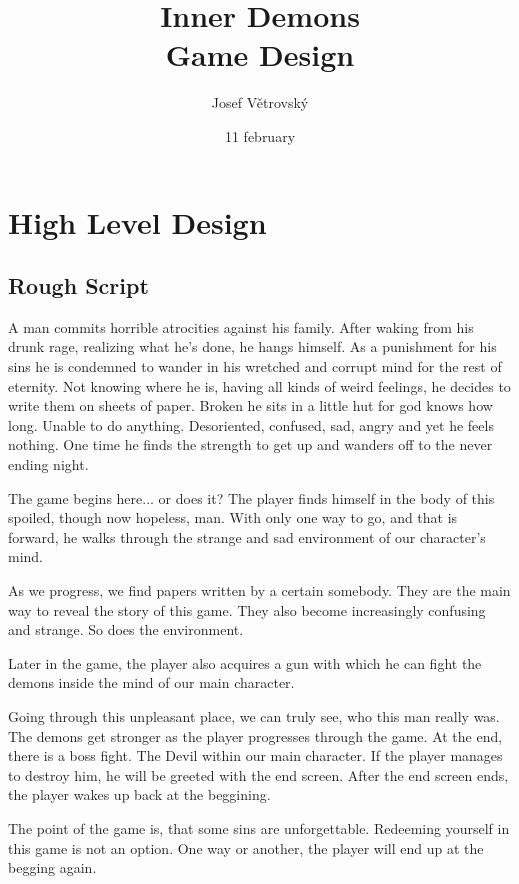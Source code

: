 \documentclass{article}
\title{Inner Demons\\Game Design}
\author{Josef Větrovský}
\date{11 february}
\begin{document}
\maketitle
\thispagestyle{empty}
\cleardoublepage
\tableofcontents
\thispagestyle{empty}
\cleardoublepage
\setcounter{page}{1}
\section{High Level Design}\label{high}
\subsection{Rough Script}
    A man commits horrible atrocities against his family. After waking from his drunk
    rage, realizing what he's done, he hangs himself. As a punishment for his sins
    he is condemned to wander in his wretched and corrupt mind for the rest of eternity.
    Not knowing where he is, having all kinds of weird feelings, he decides to write them
    on sheets of paper. Broken he sits in a little hut for god knows how long. Unable
    to do anything. Desoriented, confused, sad, angry and yet he feels nothing.
    One time he finds the strength to get up and wanders off to the never ending night.

    The game begins here... or does it? The player finds himself in the body of this
    spoiled, though now hopeless, man. With only one way to go, and that is forward,
    he walks through the strange and sad environment of our character's mind.
    
    As we progress, we find papers written by a certain somebody. They are the main way to reveal the story of
    this game. They also become increasingly confusing and strange. So does the environment.

    Later in the game, the player also acquires a gun with which he can fight the demons
    inside the mind of our main character.

    Going through this unpleasant place, we can truly see, who this man really was.
    The demons get stronger as the player progresses through the game.
    At the end, there is a boss fight. The Devil within our main character. If the player
    manages to destroy him, he will be greeted with the end screen. After the end screen
    ends, the player wakes up back at the beggining.

    The point of the game is, that some sins are unforgettable. Redeeming yourself in
    this game is not an option. One way or another, the player will end up at the begging again.
\end{document}

